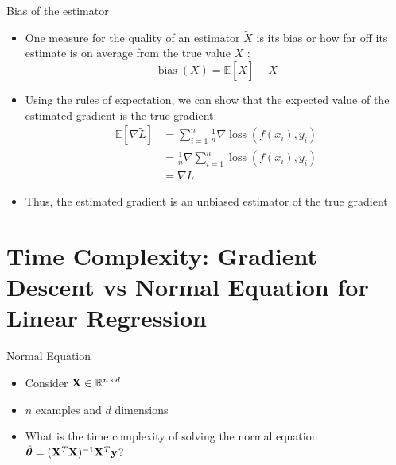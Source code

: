 \documentclass[usenames,dvipsnames]{beamer}
\begin{document}
    \begin{frame}{Bias of the estimator}
        \begin{itemize}[<+->]
            \item One measure for the quality of an estimator $\tilde{X}$ is its bias or how far off its estimate is on average from the true value $X$ :
            $$
            \operatorname{bias}(X)=\mathbb{E}[\tilde{X}]-X
            $$
           
            \item Using the rules of expectation, we can show that the expected value of the estimated gradient is the true gradient:
            $$
            \begin{aligned}
                \mathbb{E}[\nabla \tilde{L}] & =\sum_{i=1}^n \frac{1}{n} \nabla \operatorname{loss}\left(f\left(x_i\right), y_i\right) \\
                & =\frac{1}{n} \nabla \sum_{i=1}^n \operatorname{loss}\left(f\left(x_i\right), y_i\right) \\
                & =\nabla L
                \end{aligned}
                $$
                \item Thus, the estimated gradient is an unbiased estimator of the true gradient
        \end{itemize}
        
    \end{frame}

% 
                

  \section{Time Complexity: Gradient Descent vs Normal Equation for Linear Regression}
  \begin{frame}{Normal Equation}

	\begin{itemize}[<+->]
		\item Consider $\mathbf{X} \in \mathbb{R}^{n \times d}$
		\item $n$ examples and $d$ dimensions
		\item What is the time complexity of solving the normal equation $\hat{\boldsymbol{\theta}} = (\mathbf{X}^T\mathbf{X})^{-1}\mathbf{X}^T\mathbf{y}$?
	\end{itemize}
	
	

\end{frame}
\end{document}
